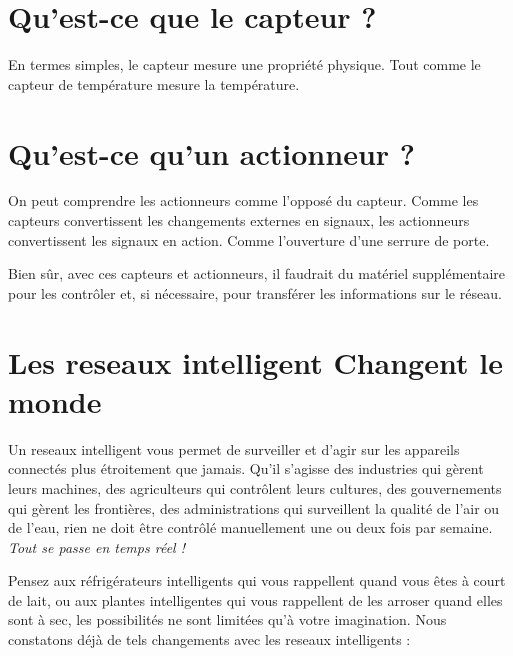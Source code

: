 \documentclass[12pt]{report}
\begin{document}
\hypertarget{quest-ce-que-le-capteur}{%
      \section{\texorpdfstring{Qu'est-ce que le capteur ?
        }{Qu'est-ce que le capteur ? }}\label{quest-ce-que-le-capteur}}

En termes simples, le capteur mesure une propriété physique. Tout comme
le capteur de température mesure la température.

\hypertarget{quest-ce-quun-actionneur}{%
      \section{\texorpdfstring{Qu'est-ce qu'un actionneur ?
        }{Qu'est-ce qu'un actionneur ? }}\label{quest-ce-quun-actionneur}}

On peut comprendre les actionneurs comme l'opposé du capteur. Comme les
capteurs convertissent les changements externes en signaux, les
actionneurs convertissent les signaux en action. Comme l'ouverture
d'une serrure de porte.

Bien sûr, avec ces capteurs et actionneurs, il faudrait du matériel
supplémentaire pour les contrôler et, si nécessaire, pour transférer les
informations sur le réseau.

\hypertarget{reseaux intelligent-changer-le-monde}{%
      \section{\texorpdfstring{Les reseaux intelligent Changent le monde
        }{Les reseaux intelligent Changent le monde }}\label{reseaux intelligent-changer-le-monde}}

Un reseaux intelligent vous permet de surveiller et d'agir sur les appareils connectés
plus étroitement que jamais. Qu'il s'agisse des industries qui gèrent
leurs machines, des agriculteurs qui contrôlent leurs cultures, des
gouvernements qui gèrent les frontières, des administrations qui
surveillent la qualité de l'air ou de l'eau, rien ne doit être contrôlé
manuellement une ou deux fois par semaine. \emph{Tout se passe en temps réel !}

Pensez aux réfrigérateurs intelligents qui vous rappellent quand vous
êtes à court de lait, ou aux plantes intelligentes qui vous rappellent
de les arroser quand elles sont à sec, les possibilités ne sont limitées
qu'à votre imagination. Nous constatons déjà de tels changements avec
les reseaux intelligents :
\end{document}
